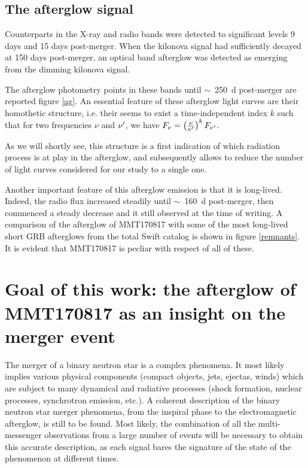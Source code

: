 \subsection{The afterglow signal}
Counterparts in the X-ray and radio bands were detected to significant levels 9 days and 15 days post-merger. When the kilonova signal had sufficiently decayed at 150 days post-merger, an optical band afterglow was detected as emerging from the dimming kilonova signal.

The afterglow photometry points in these bands until $\sim$~250~d post-merger are reported figure \ref{ag}. An essential feature of these afterglow light curves are their homothetic structure, i.e. their seems to exist a time-independent index $k$ such that for two frequencies $\nu$ and $\nu^{\prime}$, we have $F_\nu = \left( \frac{\nu}{\nu^{\prime}} \right)^k F_{\nu^{\prime}}$. 


As we will shortly see, this structure is a first indication of which radiation process is at play in the afterglow, and subsequently allows to reduce the number of light curves considered for our study to a single one.


Another important feature of this afterglow emission is that it is long-lived. Indeed, the radio flux increased steadily until $\sim$~160~d post-merger, then commenced a steady decrease and it still observed at the time of writing. A comparison of the afterglow of MMT170817 with some of the most long-lived short GRB afterglows from the total Swift catalog is shown in figure \ref{remnants}. It is evident that MMT170817 is pecliar with respect of all of these.


\section{Goal of this work: the afterglow of MMT170817 as an insight on the merger event}

The merger of a binary neutron star is a complex phenomena. It most likely implies various physical components (compact objects, jets, ejectas, winds) which are subject to many dynamical and radiative processes (shock formation, nuclear processes, synchrotron emission, etc.). A coherent description of the binary neutron star merger phenomena, from the inspiral phase to the electromagnetic afterglow, is still to be found. Most likely, the combination of all the multi-messenger observations from a large number of events will be necessary to obtain this accurate description, as each signal bares the signature of the state of the phenomenon at different times.

